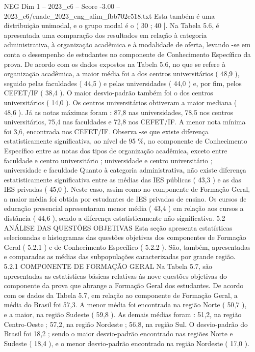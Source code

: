 \begin{textsample}{NEG Dim 1 – 2023\_c6 – Score -3.00 – 2023\_c6/enade\_2023\_eng\_alim\_fbb702e518.txt}
Esta também é uma distribuição unimodal, e o grupo modal é o ( 30 ; 40 ].
Na Tabela 5.6, é apresentada uma comparação dos resultados em relação à categoria administrativa, à organização acadêmica e à modalidade de oferta, levando -se em conta o desempenho de estudantes no componente de Conhecimento Específico da prova.
De acordo com os dados expostos na Tabela 5.6, no que se refere à organização acadêmica, a maior média foi a dos centros universitários ( 48,9 ), seguido pelas faculdades ( 44,5 ) e pelas universidades ( 44,0 ) e, por fim, pelos CEFET/IF ( 38,4 ).
O maior desvio-padrão também foi o dos centros universitários ( 14,0 ).
Os centros universitários obtiveram a maior mediana ( 48,6 ).
Já as notas máximas foram : 87,8 nas universidades, 78,5 nos centros universitários, 75,4 nas faculdades e 72,8 nos CEFET/IF.
A menor nota mínima foi 3,6, encontrada nos CEFET/IF.
Observa -se que existe diferença estatisticamente significativa, ao nível de 95 \%, no componente de Conhecimento Específico entre as notas dos tipos de organização acadêmica, exceto entre faculdade e centro universitário ; universidade e centro universitário ; universidade e faculdade Quanto à categoria administrativa, não existe diferença estatisticamente significativa entre as médias das IES públicas ( 43,3 ) e as das IES privadas ( 45,0 ).
Neste caso, assim como no componente de Formação Geral, a maior média foi obtida por estudantes de IES privadas de ensino.
Os cursos de educação presencial apresentaram menor média ( 43,4 ) em relação aos cursos a distância ( 44,6 ), sendo a diferença estatisticamente não significativa. 5.2 ANÁLISE DAS QUESTÕES OBJETIVAS Esta seção apresenta estatísticas selecionadas e histogramas das questões objetivas dos componentes de Formação Geral ( 5.2.1 ) e de Conhecimento Específico ( 5.2.2 ).
São, também, apresentadas e comparadas as médias das subpopulações caracterizadas por grande região. 5.2.1 COMPONENTE DE FORMAÇÃO GERAL Na Tabela 5.7, são apresentadas as estatísticas básicas relativas às nove questões objetivas do componente da prova que abrange a Formação Geral dos estudantes.
De acordo com os dados da Tabela 5.7, em relação ao componente de Formação Geral, a média do Brasil foi 57,3.
A menor média foi encontrada na região Norte ( 50,7 ), e a maior, na região Sudeste ( 59,8 ).
As demais médias foram : 51,2, na região Centro-Oeste ; 57,2, na região Nordeste ; 56,8, na região Sul.
O desvio-padrão do Brasil foi 18,2 ; sendo o maior desvio-padrão encontrado nas regiões Norte e Sudeste ( 18,4 ), e o menor desvio-padrão encontrado na região Nordeste ( 17,0 ).

\end{textsample}
